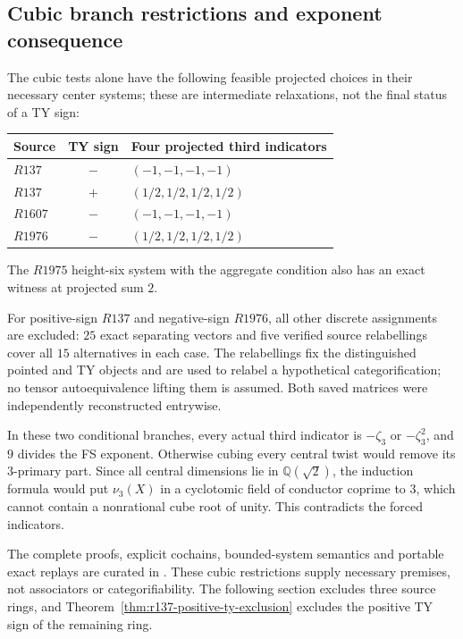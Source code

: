 \subsection{Cubic branch restrictions and exponent consequence}
The cubic tests alone have the following feasible projected choices in their necessary center systems; these are intermediate relaxations, not the final status of a TY sign:
\begin{center}\begin{tabular}{lcl}
\toprule Source & TY sign & Four projected third indicators\\\midrule
$R137$ & $-$ & $(-1,-1,-1,-1)$\\
$R137$ & $+$ & $(1/2,1/2,1/2,1/2)$\\
$R1607$ & $-$ & $(-1,-1,-1,-1)$\\
$R1976$ & $-$ & $(1/2,1/2,1/2,1/2)$\\\bottomrule
\end{tabular}\end{center}
The $R1975$ height-six system with the aggregate condition also has
an exact witness at projected sum $2$.

For positive-sign $R137$ and negative-sign $R1976$, all other discrete
assignments are excluded: $25$ exact separating vectors and five
verified source relabellings cover all $15$ alternatives in each case.
The relabellings fix the distinguished pointed and TY objects and are
used to relabel a hypothetical categorification; no tensor
autoequivalence lifting them is assumed. Both saved matrices were
independently reconstructed entrywise.

In these two conditional branches, every actual third indicator is
$-\zeta_3$ or $-\zeta_3^2$, and $9$ divides the FS exponent. Otherwise
cubing every central twist would remove its $3$-primary part. Since
all central dimensions lie in $\mathbb Q(\sqrt2)$, the induction formula
would put $\nu_3(X)$ in a cyclotomic field of conductor coprime to $3$,
which cannot contain a nonrational cube root of unity. This contradicts
the forced indicators.

The complete proofs, explicit cochains, bounded-system semantics and
portable exact replays are curated in
.
These cubic restrictions supply necessary premises, not associators or categorifiability. The following section excludes three source rings, and Theorem~\ref{thm:r137-positive-ty-exclusion} excludes the positive TY sign of the remaining ring.

